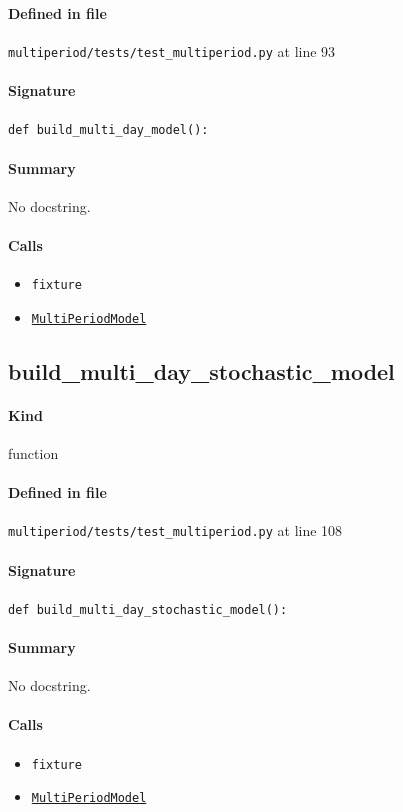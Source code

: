 \documentclass[11pt]{report}
\begin{document}
\paragraph{Defined in file} \texttt{multiperiod/tests/test\_multiperiod.py} at line 93
\paragraph{Signature} \texttt{def build\_multi\_day\_model():}
\paragraph{Summary} No docstring.
\paragraph{Calls}
\begin{itemize}[leftmargin=*]
  \item \texttt{fixture}
  \item \hyperref[def:multiperiod-multiperiod.py:MultiPeriodModel:L24]{\texttt{MultiPeriodModel}}
\end{itemize}
\subsection{build\_multi\_day\_stochastic\_model}
\label{def:multiperiod-tests-test_multiperiod.py:build_multi_day_stochastic_model:L108}
\paragraph{Kind} function
\paragraph{Defined in file} \texttt{multiperiod/tests/test\_multiperiod.py} at line 108
\paragraph{Signature} \texttt{def build\_multi\_day\_stochastic\_model():}
\paragraph{Summary} No docstring.
\paragraph{Calls}
\begin{itemize}[leftmargin=*]
  \item \texttt{fixture}
  \item \hyperref[def:multiperiod-multiperiod.py:MultiPeriodModel:L24]{\texttt{MultiPeriodModel}}
\end{itemize}
\end{document}
